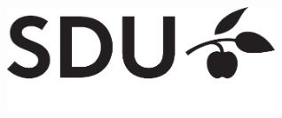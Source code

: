 
\begin{titlepage}

	\begin{center}
	\includegraphics[width=80mm,keepaspectratio]{figures/sdu_black}\\

	\vspace{0.3cm}
	\textbf{\institute}\\

	\textmd{\department}\\
	\textmd{\program}  %
	\\[4cm]


\end{center}
\end{titlepage}
